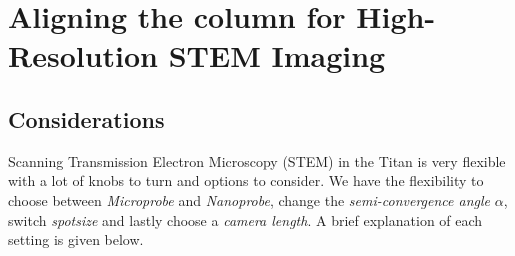 \documentclass[a4paper]{scrartcl}
\begin{document}
\section*{Aligning the column for High-Resolution STEM Imaging}

\subsection*{Considerations}
Scanning Transmission Electron Microscopy (STEM) in the Titan is very flexible with a lot of knobs to turn and options to consider. We have the flexibility to choose between \textit{Microprobe} and \textit{Nanoprobe}, change the \textit{semi-convergence angle} $\alpha$, switch \textit{spotsize} and lastly choose a \textit{camera length}. A brief explanation of each setting is given below.\\
\end{document}
